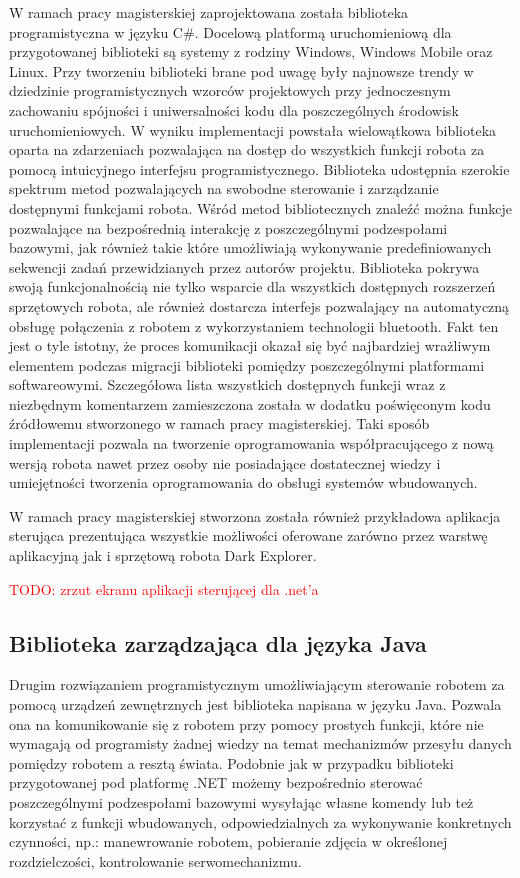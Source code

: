 W ramach pracy magisterskiej zaprojektowana została biblioteka programistyczna w
języku C\#. Docelową platformą uruchomieniową dla przygotowanej biblioteki są
systemy z rodziny Windows, Windows Mobile oraz Linux. Przy tworzeniu biblioteki
brane pod uwagę były najnowsze trendy w dziedzinie programistycznych wzorców
projektowych przy jednoczesnym zachowaniu spójności i uniwersalności kodu dla
poszczególnych środowisk uruchomieniowych. W wyniku implementacji powstała
wielowątkowa biblioteka oparta na zdarzeniach pozwalająca na dostęp do wszystkich
funkcji robota za pomocą intuicyjnego interfejsu programistycznego. Biblioteka
udostępnia szerokie spektrum metod pozwalających na swobodne sterowanie i
zarządzanie dostępnymi funkcjami robota. Wśród metod bibliotecznych znaleźć można
funkcje pozwalające na bezpośrednią interakcję z poszczególnymi podzespołami
bazowymi, jak również takie które umożliwiają wykonywanie predefiniowanych
sekwencji zadań przewidzianych przez autorów projektu. Biblioteka pokrywa swoją
funkcjonalnością nie tylko wsparcie dla wszystkich dostępnych rozszerzeń
sprzętowych robota, ale również dostarcza interfejs pozwalający na automatyczną
obsługę połączenia z robotem z wykorzystaniem technologii bluetooth. Fakt ten
jest o tyle istotny, że proces komunikacji okazał się być najbardziej wrażliwym
elementem podczas migracji biblioteki pomiędzy poszczególnymi platformami
softwareowymi. Szczegółowa lista wszystkich dostępnych funkcji wraz z niezbędnym
komentarzem zamieszczona została w dodatku poświęconym kodu źródłowemu
stworzonego w ramach pracy magisterskiej. Taki sposób implementacji pozwala na
tworzenie oprogramowania współpracującego z nową wersją robota nawet przez osoby
nie posiadające dostatecznej wiedzy i umiejętności tworzenia oprogramowania do
obsługi systemów wbudowanych.

W ramach pracy magisterskiej stworzona została również przykładowa aplikacja
sterująca prezentująca wszystkie możliwości oferowane zarówno przez warstwę
aplikacyjną jak i sprzętową robota Dark Explorer. 

\textcolor{red}{TODO: zrzut ekranu aplikacji sterującej dla .net'a}

\subsection{Biblioteka zarządzająca dla języka Java}
\label{subsec:sdk-java}
Drugim rozwiązaniem programistycznym umożliwiającym sterowanie robotem za pomocą
urządzeń zewnętrznych jest biblioteka napisana w języku Java. Pozwala ona na
komunikowanie się z robotem przy pomocy prostych funkcji, które nie wymagają od
programisty żadnej wiedzy na temat mechanizmów przesyłu danych pomiędzy robotem a
resztą świata. Podobnie jak w przypadku biblioteki przygotowanej pod platformę
.NET możemy bezpośrednio sterować poszczególnymi podzespołami bazowymi wysyłając
własne komendy lub też korzystać z funkcji wbudowanych, odpowiedzialnych za
wykonywanie konkretnych czynności, np.: manewrowanie robotem, pobieranie zdjęcia
w określonej rozdzielczości, kontrolowanie serwomechanizmu.

